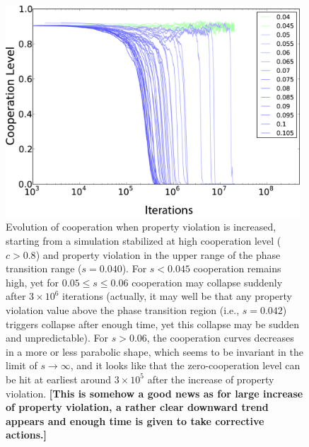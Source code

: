 
\begin{figure}[h]
\begin{center}
\centerline{\includegraphics[width=11cm]{../figures2/resistance004.png}}
\caption{Evolution of cooperation when property violation is increased, starting from a simulation stabilized at high cooperation level ($c > 0.8$) and property violation in the upper range of the phase transition range ($s=0.040$). For $s < 0.045$ cooperation remains high, yet for  $0.05 \leqslant s \leqslant 0.06$ cooperation may collapse suddenly after $3\times10^6$ iterations (actually, it may well be that any property violation value above the phase transition region (i.e., $s=0.042$) triggers collapse after enough time, yet this collapse may be sudden and unpredictable). For $s>0.06$, the cooperation curves decreases in a more or less parabolic shape, which seems to be invariant in the limit of $s \rightarrow \infty$, and it looks like that the zero-cooperation level can be hit at earliest around $3 \times 10^5$ after the increase of property violation. {\bf [This is somehow a good news as for large increase of property violation, a rather clear downward trend appears and enough time is given to take corrective actions.]}}
\label{fig:resistance}
\end{center}
\end{figure}

